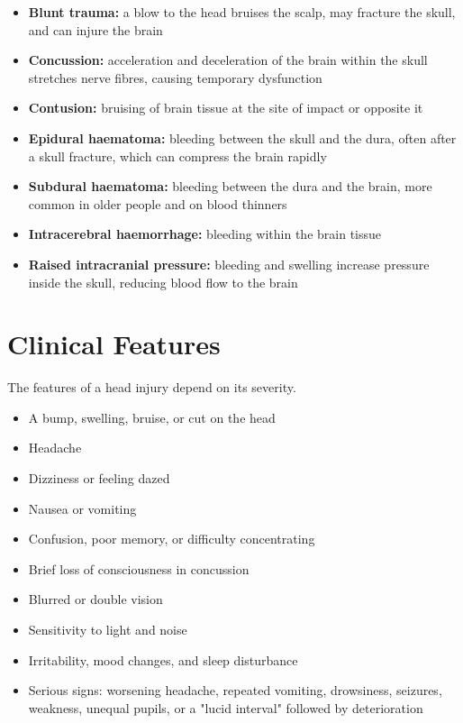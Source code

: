 \begin{itemize}
    \item \textbf{Blunt trauma:} a blow to the head bruises the scalp, may fracture the skull, and can injure the brain
    \item \textbf{Concussion:} acceleration and deceleration of the brain within the skull stretches nerve fibres, causing temporary dysfunction
    \item \textbf{Contusion:} bruising of brain tissue at the site of impact or opposite it
    \item \textbf{Epidural haematoma:} bleeding between the skull and the dura, often after a skull fracture, which can compress the brain rapidly
    \item \textbf{Subdural haematoma:} bleeding between the dura and the brain, more common in older people and on blood thinners
    \item \textbf{Intracerebral haemorrhage:} bleeding within the brain tissue
    \item \textbf{Raised intracranial pressure:} bleeding and swelling increase pressure inside the skull, reducing blood flow to the brain
\end{itemize}

\section*{Clinical Features}
The features of a head injury depend on its severity.

\begin{itemize}
    \item A bump, swelling, bruise, or cut on the head
    \item Headache
    \item Dizziness or feeling dazed
    \item Nausea or vomiting
    \item Confusion, poor memory, or difficulty concentrating
    \item Brief loss of consciousness in concussion
    \item Blurred or double vision
    \item Sensitivity to light and noise
    \item Irritability, mood changes, and sleep disturbance
    \item Serious signs: worsening headache, repeated vomiting, drowsiness, seizures, weakness, unequal pupils, or a "lucid interval" followed by deterioration
\end{itemize}

